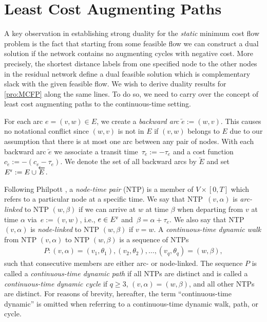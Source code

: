 \documentclass{svjour3}                     \smartqed
\begin{document}
\section{Least Cost Augmenting Paths}
\label{sex:SAP}
A key observation in establishing strong duality for the \emph{static} minimum cost flow problem is the fact that starting from some feasible flow we can construct a dual solution if the network contains no augmenting cycles with negative cost. More precisely, the shortest distance labels from one specified node to the other nodes in the residual network define a dual feasible solution which is complementary slack with the given feasible flow. We wish to derive duality results for \eqref{pro:MCFP} along the same lines. To do so, we need to carry over the concept of least cost augmenting paths to the continuous-time setting. 


For each arc $e=(v,w)\in E$, we create a \emph{backward arc} $\overleftarrow{e} :=(w,v)$. This causes no notational conflict since $(w,v)$ is not in $E$ if $(v,w)$ belongs to $E$ due to our assumption that  there is at most one arc between any pair of nodes. 
With each backward arc $\overleftarrow{e}$ we associate a transit time~$\tau_{\overleftarrow{e}}:=-\tau_e$ and a cost function $c_{\overleftarrow{e}}:=-(c_{e}-\tau_e)$. We denote the set of all backward arcs by $\overleftarrow{E}$ and set
$E^\text r := E \cup \overleftarrow{E}$.




Following Philpott \cite{Philpott85}, a \emph{node-time pair} (NTP) is a member of $V\times [0,T]$ which refers to a particular node at a specific time. We say that NTP~$(v,\alpha)$ is \emph{arc-linked} to NTP $(w,\beta)$ if we can arrive at $w$ at time $\beta$ when departing from $v$ at time $\alpha$ via~${e:=(v,w)}$, i.e., $e\in E^\text r$ and~$\beta=\alpha+\tau_{e}$. We also say that NTP $(v,\alpha)$ is \emph{node-linked} to NTP $(w,\beta)$ if $v=w$. 
A \emph{continuous-time dynamic walk} from NTP $(v,\alpha)$ to NTP $(w,\beta)$ is a sequence of NTPs
\begin{align*}
P:(v,\alpha)=(v_1,\theta_{1}),(v_2,\theta_{2}),\ldots,(v_q,\theta_{q})=(w,\beta),
\end{align*}
such that consecutive members are either arc- or node-linked. 
The sequence $P$ is called a \emph{continuous-time dynamic path} if all NTPs are distinct and is called a \emph{continuous-time dynamic cycle} if $q \geq 3$, $(v,\alpha)=(w,\beta)$, and all other NTPs are distinct. For reasons of brevity, hereafter, the term ``continuous-time dynamic'' is omitted when referring to a continuous-time dynamic walk, path, or cycle.
\end{document}
